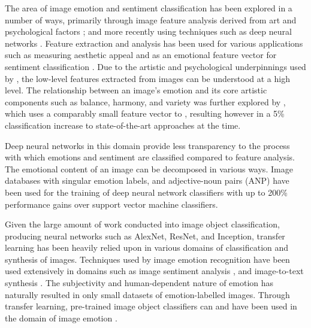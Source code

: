\documentclass{article}
\begin{document}
The area of image emotion and sentiment classification has been explored in a number of ways, primarily through image feature analysis derived from art and psychological factors \citep{machajdik2010affective}; and more recently using techniques such as deep neural networks \citep{chen2015learning, kim2018building}.
Feature extraction and analysis has been used for various applications such as measuring aesthetic appeal \citep{den2010using,den2010comparing,den2011evolving} and as an emotional feature vector for sentiment classification \citep{machajdik2010affective}.
Due to the artistic and psychological underpinnings used by \citet{machajdik2010affective}, the low-level features extracted from images can be understood at a high level.
The relationship between an image's emotion and its core artistic components such as balance, harmony, and variety was further explored by \citet{zhao2014exploring}, which uses a comparably small feature vector to \citet{machajdik2010affective}, resulting however in a 5\% classification increase to state-of-the-art approaches at the time.

Deep neural networks in this domain provide less transparency to the process with which emotions and sentiment are classified compared to feature analysis.
The emotional content of an image can be decomposed in various ways.
Image databases with singular emotion labels, and adjective-noun pairs (ANP) have been used for the training of deep neural network classifiers \citep{chen2014deepsentibank, yang2018visual} with up to 200\% performance gains over support vector machine classifiers.

Given the large amount of work conducted into image object classification, producing neural networks such as AlexNet, ResNet, and Inception, transfer learning has been heavily relied upon in various domains of classification and synthesis of images.
Techniques used by image emotion recognition have been used extensively in domains such as image sentiment analysis \citep{you2015robust}, and image-to-text synthesis \citep{vinyals2015show}.
The subjectivity and human-dependent nature of emotion has naturally resulted in only small datasets of emotion-labelled images.
Through transfer learning, pre-trained image object classifiers can and have been used in the domain of image emotion \citep{kim2018building, wangarttalk}.
\end{document}
